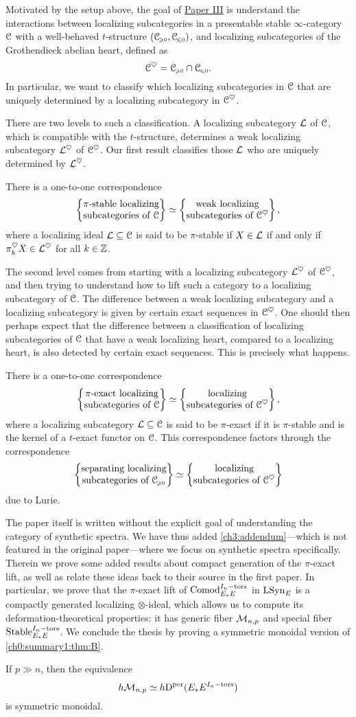 Motivated by the setup above, the goal of \hyperref[ch3]{Paper III} is understand the interactions between localizing subcategories in a presentable stable $\infty$-category $\EuScript{C}$ with a well-behaved $t$-structure $(\EuScript{C}_{\hspace{-1pt}\scriptscriptstyle\geqslant 0}, \EuScript{C}_{\hspace{-1pt}\scriptscriptstyle\leqslant 0})$, and localizing subcategories of the Grothendieck abelian heart, defined as 
\[\EuScript{C}^\heartsuit = \EuScript{C}_{\hspace{-1pt}\scriptscriptstyle\geqslant 0}\cap \EuScript{C}_{\hspace{-1pt}\scriptscriptstyle\leqslant 0}.\] 
In particular, we want to classify which localizing subcategories in $\EuScript{C}$ that are uniquely determined by a localizing subcategory in $\EuScript{C}^\heartsuit$. 

There are two levels to such a classification. A localizing subcategory $\mathcal{L}$ of $\EuScript{C}$, which is compatible with the $t$-structure, determines a weak localizing subcategory $\mathcal{L}^\heartsuit$ of $\EuScript{C}^\heartsuit$. Our first result classifies those $\mathcal{L}$ who are uniquely determined by $\mathcal{L}^\heartsuit$. 

\begin{theorem}
    There is a one-to-one correspondence
    \[\left\{ \begin{matrix} \pi\text{-stable localizing}\\ \text{subcategories of }\EuScript{C} \end{matrix} \right\} \simeq \left\{ \begin{matrix} \text{weak localizing}\\ \text{subcategories of }\EuScript{C}^\heartsuit \end{matrix} \right\},\]
    where a localizing ideal $\mathcal{L}\subseteq \EuScript{C}$ is said to be $\pi$-stable if $X\in \mathcal{L}$ if and only if $\pi_k^\heartsuit X \in \mathcal{L}^\heartsuit$ for all $k\in \mathbb{Z}$.  
\end{theorem}

The second level comes from starting with a localizing subcategory $\mathcal{L}^\heartsuit$ of $\EuScript{C}^\heartsuit$, and then trying to understand how to lift such a category to a localizing subcategory of $\EuScript{C}$. The difference between a weak localizing subcategory and a localizing subcategory is given by certain exact sequences in $\EuScript{C}^\heartsuit$. One should then perhaps expect that the difference between a classification of localizing subcategories of $\EuScript{C}$ that have a weak localizing heart, compared to a localizing heart, is also detected by certain exact sequences. This is precisely what happens.

\begin{theorem}
    There is a one-to-one correspondence
    \[\left\{ \begin{matrix} \pi\text{-exact localizing}\\ \text{subcategories of }\EuScript{C} \end{matrix} \right\} \simeq \left\{ \begin{matrix} \text{localizing}\\ \text{subcategories of }\EuScript{C}^\heartsuit \end{matrix} \right\},\]
    where a localizing subcategory $\mathcal{L}\subseteq \EuScript{C}$ is said to be $\pi$-exact if it is $\pi$-stable and is the kernel of a $t$-exact functor on $\EuScript{C}$. This correspondence factors through the correspondence
    \[\left\{ \begin{matrix} \text{separating localizing}\\ \text{subcategories of }\EuScript{C}_{\hspace{-1pt}\scriptscriptstyle\geqslant 0} \end{matrix} \right\} \simeq \left\{ \begin{matrix} \text{localizing}\\ \text{subcategories of }\EuScript{C}^\heartsuit \end{matrix} \right\}\]
    due to Lurie. 
\end{theorem}

The paper itself is written without the explicit goal of understanding the category of synthetic spectra. We have thus added \cref{ch3:addendum}---which is not featured in the original paper---where we focus on synthetic spectra specifically. Therein we prove some added results about compact generation of the $\pi$-exact lift, as well as relate these ideas back to their source in the first paper. In particular, we prove that the $\pi$-exact lift of $\mathrm{Comod}_{E_*E}^{I_n-\mathrm{tors}}$ in $\mathrm{LSyn}_{E}$ is a compactly generated localizing $\otimes$-ideal, which allows us to compute its deformation-theoretical properties: it has generic fiber $\mathcal{M}_{n,p}$ and special fiber $\mathrm{Stable}_{E_*E}^{I_n-\mathrm{tors}}$. We conclude the thesis by proving a symmetric monoidal version of \cref{ch0:summary1:thm:B}. 

\begin{theorem}
    If $p\gg n$, then the equivalence
    \[h\mathcal{M}_{n,p} \simeq h \mathrm{D}^{\mathrm{per}}(E_*E^{I_n-\mathrm{tors}})\] 
    is symmetric monoidal. 
\end{theorem}
